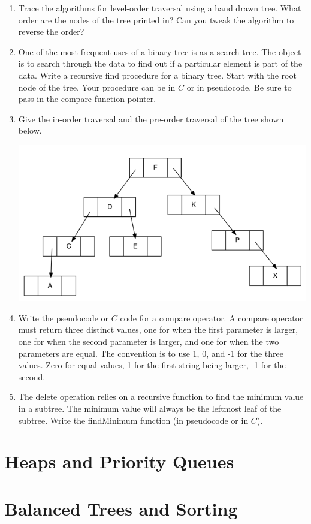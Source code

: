 \documentclass{article}
\begin{document}
\begin{enumerate}
	\vspace{1.5cm}
	\item Trace the algorithms for level-order traversal using a hand drawn tree. What order are the nodes of the tree printed in? Can you tweak the algorithm to reverse the order?
	\vspace{6cm}
	\item One of the most frequent uses of a binary tree is as a search tree. The object is to search through the data to find out if a particular element is part of the data. Write a recursive find procedure for a binary tree. Start with the root node of the tree. Your procedure can be in \(C\) or in pseudocode. Be sure to pass in the compare function pointer.
	\vspace{6cm}
	\item Give the in-order traversal and the pre-order traversal of the tree shown below.
		\begin{center}
		\includegraphics[scale=0.5]{tree}
		\end{center}
	\vspace{2cm}
	\item Write the pseudocode or \(C\) code for a compare operator. A compare operator must return three distinct values, one for when the first parameter is larger, one for when the second parameter is larger, and one for when the two parameters are equal. The convention is to use 1, 0, and -1 for the three values. Zero for equal values, 1 for the first string being larger, -1 for the second.
	\vspace{5cm}
	\item The delete operation relies on a recursive function to find the minimum value in a subtree. The minimum value will always be the leftmost leaf of the subtree. Write the findMinimum function (in pseudocode or in \(C\)).
	\vspace{5cm}
	\newpage
\end{enumerate}

\medskip
\section{Heaps and Priority Queues}

\medskip
\section{Balanced Trees and Sorting}
\end{document}
